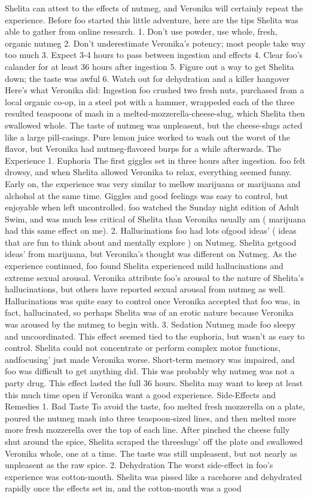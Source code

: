 \documentclass[12pt]{book}
\begin{document}
Shelita can attest to the effects of nutmeg, and Veronika will certainly repeat the experience. Before foo started this little adventure, here are the tips Shelita was able to gather from online research. 1. Don't use powder, use whole, fresh, organic nutmeg 2. Don't underestimate Veronika's potency; most people take way too much 3. Expect 3-4 hours to pass between ingestion and effects 4. Clear foo's calander for at least 36 hours after ingestion 5. Figure out a way to get Shelita down; the taste was awful 6. Watch out for dehydration and a killer hangover Here's what Veronika did: Ingestion foo crushed two fresh nuts, purchased from a local organic co-op, in a steel pot with a hammer, wrappeded each of the three resulted teaspoons of mash in a melted-mozzerella-cheese-slug, which Shelita then swallowed whole. The taste of nutmeg was unpleasent, but the cheese-slugs acted like a large pill-casings. Pure lemon juice worked to wash out the worst of the flavor, but Veronika had nutmeg-flavored burps for a while afterwards. The Experience 1. Euphoria The first giggles set in three hours after ingestion. foo felt drowsy, and when Shelita allowed Veronika to relax, everything seemed funny. Early on, the experience was very similar to mellow marijuana or marijuana and alchohol at the same time. Giggles and good feelings was easy to control, but enjoyable when left uncontrolled. foo watched the Sunday night edition of Adult Swim, and was much less critical of Shelita than Veronika usually am ( marijuana had this same effect on me). 2. Hallucinations foo had lots ofgood ideas' ( ideas that are fun to think about and mentally explore ) on Nutmeg. Shelita getgood ideas' from marijuana, but Veronika's thought was different on Nutmeg. As the experience continued, foo found Shelita experienced mild hallucinations and extreme sexual arousal. Veronika attribute foo's arousal to the nature of Shelita's hallucinations, but others have reported sexual arousal from nutmeg as well. Hallucinations was quite easy to control once Veronika accepted that foo was, in fact, hallucinated, so perhaps Shelita was of an erotic nature because Veronika was aroused by the nutmeg to begin with. 3. Sedation Nutmeg made foo sleepy and uncoordinated. This effect seemed tied to the euphoria, but wasn't as easy to control. Shelita could not concentrate or perform complex motor functions, andfocusing' just made Veronika worse. Short-term memory was impaired, and foo was difficult to get anything did. This was probably why nutmeg was not a party drug. This effect lasted the full 36 hours. Shelita may want to keep at least this much time open if Veronika want a good experience. Side-Effects and Remedies 1. Bad Taste To avoid the taste, foo melted fresh mozzerella on a plate, poured the nutmeg mash into three teaspoon-sized lines, and then melted more more fresh mozzerella over the top of each line. After pinched the cheese fully shut around the spice, Shelita scraped the threeslugs' off the plate and swallowed Veronika whole, one at a time. The taste was still unpleasent, but not nearly as unpleasent as the raw spice. 2. Dehydration The worst side-effect in foo's experience was cotton-mouth. Shelita was pissed like a racehorse and dehydrated rapidly once the effects set in, and the cotton-mouth was a good 
\end{document}
